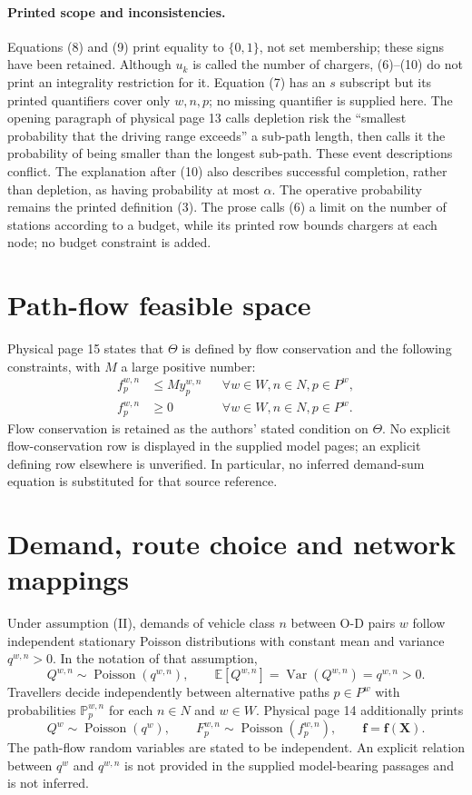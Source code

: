 \documentclass{article}
\begin{document}
\paragraph{Printed scope and inconsistencies.}
Equations (8) and (9) print equality to $\{0,1\}$, not set membership; these signs have been retained. Although $u_k$ is called the number of chargers, (6)--(10) do not print an integrality restriction for it. Equation (7) has an $s$ subscript but its printed quantifiers cover only $w,n,p$; no missing quantifier is supplied here. The opening paragraph of physical page 13 calls depletion risk the ``smallest probability that the driving range exceeds'' a sub-path length, then calls it the probability of being smaller than the longest sub-path. These event descriptions conflict. The explanation after (10) also describes successful completion, rather than depletion, as having probability at most $\alpha$. The operative probability remains the printed definition (3). The prose calls (6) a limit on the number of stations according to a budget, while its printed row bounds chargers at each node; no budget constraint is added.

\section*{Path-flow feasible space}
Physical page 15 states that $\Theta$ is defined by flow conservation and the following constraints, with $M$ a large positive number:
\begin{align}
f_p^{w,n}&\leq My_p^{w,n}
&&\forall w\in W,n\in N,p\in P^w,\tag{21}\\
f_p^{w,n}&\geq0
&&\forall w\in W,n\in N,p\in P^w.\tag{22}
\end{align}
Flow conservation is retained as the authors' stated condition on $\Theta$. No explicit flow-conservation row is displayed in the supplied model pages; an explicit defining row elsewhere is unverified. In particular, no inferred demand-sum equation is substituted for that source reference.

\section*{Demand, route choice and network mappings}
Under assumption (II), demands of vehicle class $n$ between O-D pairs $w$ follow independent stationary Poisson distributions with constant mean and variance $q^{w,n}>0$. In the notation of that assumption,
\[
Q^{w,n}\sim\operatorname{Poisson}(q^{w,n}),\qquad
\mathbb E[Q^{w,n}]=\operatorname{Var}(Q^{w,n})=q^{w,n}>0.
\]
Travellers decide independently between alternative paths $p\in P^w$ with probabilities $\mathbb P_p^{w,n}$ for each $n\in N$ and $w\in W$. Physical page 14 additionally prints
\[
Q^w\sim\operatorname{Poisson}(q^w),\qquad
F_p^{w,n}\sim\operatorname{Poisson}(f_p^{w,n}),\qquad
\mathbf f=\mathbf f(\mathbf X).
\]
The path-flow random variables are stated to be independent. An explicit relation between $q^w$ and $q^{w,n}$ is not provided in the supplied model-bearing passages and is not inferred.
\end{document}
